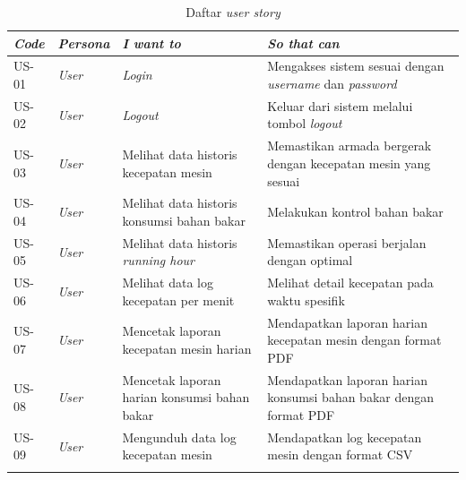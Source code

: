     \begin{longtable}[!h]
        {
            p{}
            p{}
            p{}
            p{}
        }
        \caption{Daftar \textit{user story}} \\

            \toprule
            \textit{Code} &
            \textit{Persona} &
            \textit{I want to} &
            \textit{So that can} \\ [0.5ex]
            \midrule

            US-01 &
            \textit{User} &
            \textit{Login} &
            Mengakses sistem sesuai dengan \textit{username} dan \textit{password}
            \\

            US-02 &
            \textit{User} &
            \textit{Logout} &
            Keluar dari sistem melalui tombol \textit{logout} \\

            US-03 &
            \textit{User} &
            Melihat data historis kecepatan mesin &
            Memastikan armada bergerak dengan kecepatan mesin yang sesuai
            \\

            US-04 &
            \textit{User} &
            Melihat data historis konsumsi bahan bakar &
            Melakukan kontrol bahan bakar
            \\

            US-05 &
            \textit{User} &
            Melihat data historis \textit{running hour} &
            Memastikan operasi berjalan dengan optimal
            \\

            US-06 &
            \textit{User} &
            Melihat data log kecepatan per menit &
            Melihat detail kecepatan pada waktu spesifik
            \\

            US-07 &
            \textit{User} &
            Mencetak laporan kecepatan mesin harian &
            Mendapatkan laporan harian kecepatan mesin dengan format PDF
            \\

            US-08 &
            \textit{User} &
            Mencetak laporan harian konsumsi bahan bakar &
            Mendapatkan laporan harian konsumsi bahan bakar dengan format PDF
            \\

            US-09 &
            \textit{User} &
            Mengunduh data log kecepatan mesin &
            Mendapatkan log kecepatan mesin dengan format CSV
            \\ [1ex]
            \bottomrule
        \label{tab:user-story}
    \end{longtable}


